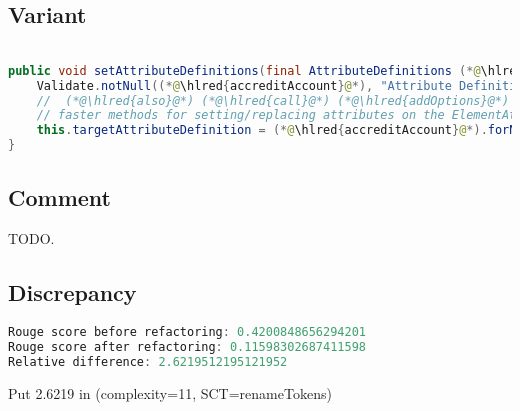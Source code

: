 \documentclass[11pt]{article}
\DeclareRobustCommand{\hlred}[1]{{\sethlcolor{YellowOrange}\hl{#1}}}
\begin{document}
  \subsection{Variant}

  \begin{lstlisting}[language=java]

public void setAttributeDefinitions(final AttributeDefinitions (*@\hlred{accreditAccount}@*)) {
    Validate.notNull((*@\hlred{accreditAccount}@*), "Attribute Definitions cannot be null");
    //  (*@\hlred{also}@*) (*@\hlred{call}@*) (*@\hlred{addOptions}@*) (*@\hlred{or}@*) (*@\hlred{apply}@*) (*@\hlred{options}@*) (*@\hlred{on}@*) (*@\hlred{it}@*) (*@\hlred{and}@*) (*@\hlred{addTo}@*) (*@\hlred{instead}@*) to (*@\hlred{implement}@*) (*@\hlred{any}@*)
    // faster methods for setting/replacing attributes on the ElementAttributes implementation
    this.targetAttributeDefinition = (*@\hlred{accreditAccount}@*).forName(getTemplateMode(), this.targetAttrCompleteName);
}
  \end{lstlisting}

  \subsection{Comment}

  TODO.

  \subsection{Discrepancy}

  \begin{lstlisting}[language=java]
Rouge score before refactoring: 0.4200848656294201
Rouge score after refactoring: 0.11598302687411598
Relative difference: 2.6219512195121952
  \end{lstlisting}

  Put 2.6219 in (complexity=11, SCT=renameTokens)
\end{document}
